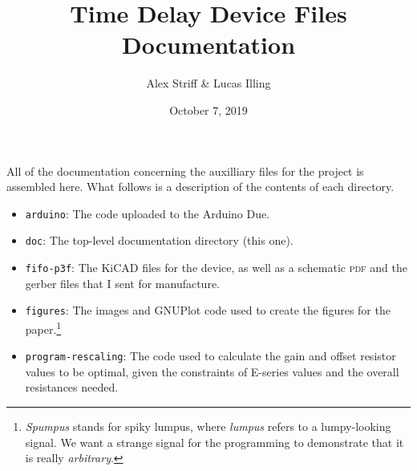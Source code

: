 \documentclass[11pt,letterpaper]{article}
\title{Time Delay Device Files Documentation}
\author{Alex Striff \& Lucas Illing}
\date{October 7, 2019}
\begin{document}
\maketitle

All of the documentation concerning the auxilliary files for the project is
assembled here. What follows is a description of the contents of each directory.

\begin{itemize}
  \item \texttt{arduino}: The code uploaded to the Arduino Due.
  \item \texttt{doc}: The top-level documentation directory (this one).
  \item \texttt{fifo-p3f}: The KiCAD files for the device, as well as a
    schematic \textsc{pdf} and the gerber files that I sent for manufacture.
  \item \texttt{figures}: The images and GNUPlot code used to create the figures
    for the paper.\footnote{\emph{Spumpus} stands for spiky lumpus, where
      \emph{lumpus} refers to a lumpy-looking signal. We want a strange signal
    for the programming to demonstrate that it is really \emph{arbitrary}.}
  \item \texttt{program-rescaling}: The code used to calculate the gain and
    offset resistor values to be optimal, given the constraints of E-series
    values and the overall resistances needed.
\end{itemize}
\end{document}
